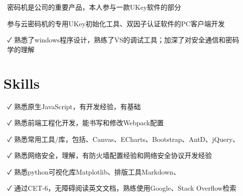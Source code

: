 \documentclass[14pt]{resume}
\begin{document}
\begin{itemize}
    \item[\faFlagO] 密码机是公司的重要产品，本人参与一款UKey软件的\textbf{\color{red}{windows开发}}部分
    \item[\faCode] 参与云密码机的专用UKey初始化工具、双因子认证软件的PC客户端开发
    \item[\faCheck] 熟悉了windows程序设计，熟练了VS的调试工具；加深了对安全通信和密码学的理解
\end{itemize}


\section{\faCogs\ Skills}

\begin{itemize}
    \item[\faCheck] 熟悉原生JavaScript，有\textbf{\color{red}{H5移动端小游戏}}开发经验，有\textbf{\color{red}{python}}基础
    \item[\faCheck] 熟悉前端工程化开发，能书写和修改Webpack配置
    \item[\faCheck] 熟悉常用工具/库，包括\textbf{\color{red}{React.js}}、Canvas、ECharts、Bootstrap、AntD、jQuery、
    \item[\faCheck] 熟悉网络安全，理解\textbf{\color{red}{HTTPS}}，有防火墙配置经验和网络安全协议开发经验
    \item[\faCheck] 熟悉python可视化库Matplotlib、排版工具Markdown、\textbf{\color{red}{LaTex}}
    \item[\faCheck] 通过CET-6，无障碍阅读英文文档，熟练使用Google、Stack Overflow检索
\end{itemize}
\end{document}
